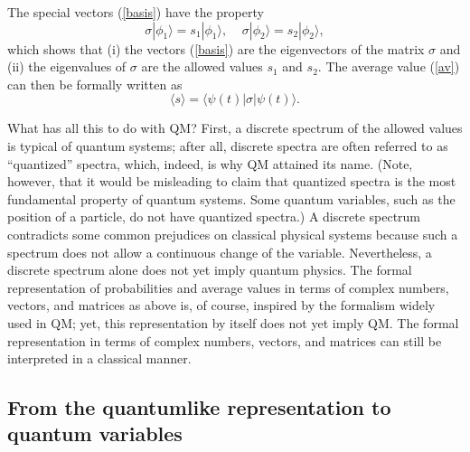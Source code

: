 \documentclass[12pt]{article}
\begin{document}
The special vectors (\ref{basis}) have the property 
\begin{equation}\label{s12}
\sigma |\phi_1\rangle=s_1|\phi_1\rangle , \;\;\;\;
\sigma |\phi_2\rangle=s_2|\phi_2\rangle ,
\end{equation}
which shows that (i) the vectors (\ref{basis}) are the eigenvectors of 
the matrix $\sigma$ and (ii) the eigenvalues of $\sigma$ are 
the allowed values $s_1$ and $s_2$.  
The average value (\ref{av}) can then be formally written as
\begin{equation}
\langle s \rangle =\langle \psi(t)|\sigma |\psi(t) \rangle .
\end{equation}

What has all this to do with QM? First, a discrete spectrum 
of the allowed values is typical of quantum systems; after all, 
discrete spectra are often referred to as ``quantized'' spectra,
which, indeed, is why QM attained its name.
(Note, however, that it would be misleading
to claim that quantized spectra is the most fundamental property of
quantum systems. Some quantum variables, such as the position of a particle,
do not have quantized spectra.)
A discrete spectrum contradicts some common
prejudices on classical physical systems because
such a spectrum does not allow a continuous change of the variable.
Nevertheless, a discrete spectrum alone does not yet imply
quantum physics. The formal representation of probabilities and average 
values in terms of complex numbers, vectors, and matrices
as above is, of course, inspired by the 
formalism widely used in QM; yet, this representation by itself 
does not yet imply QM. The formal representation in terms of
complex numbers, vectors, and matrices can still be interpreted 
in a classical manner.

\subsection{From the quantumlike representation to quantum variables}
\end{document}
